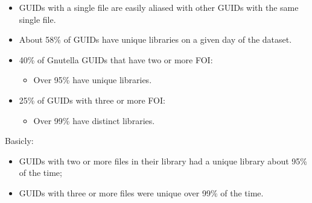 \documentclass[notes]{beamer}
\begin{document}
\begin{frame}

\begin{itemize}

\item[\checkmark]GUIDs with a single file are easily aliased with other GUIDs with the same single file.

\item[\checkmark]About 58\% of GUIDs have unique libraries on a
given day of the dataset.

\end{itemize}

\end{frame}

\begin{frame}

\begin{itemize}

\item[\checkmark]40\% of Gnutella GUIDs that have two or more FOI:
	\begin{itemize}
	\item Over 95\% have unique libraries.
	\end{itemize}

\item[\checkmark]25\% of GUIDs with three or more FOI: 
	\begin{itemize}
	\item Over 99\% have distinct libraries.
	\end{itemize}

\end{itemize}

\end{frame}

\begin{frame}

\begin{block}{Basicly:}

\begin{itemize}

\item[\checkmark]GUIDs with two or more files in their library had a unique library about 95\% of the time;

\item[\checkmark]GUIDs with three or more files were unique over 99\% of the time.

\end{itemize}

\end{block}

\end{frame}
\end{document}
